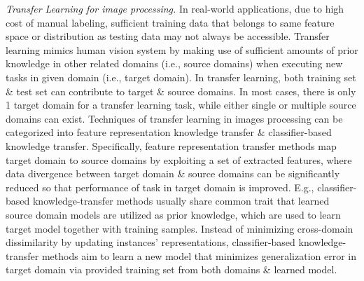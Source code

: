 \documentclass{article}
\begin{document}
\begin{itemize}
\begin{itemize}
\begin{itemize}
            {\it Transfer Learning for image processing.} In real-world applications, due to high cost of manual labeling, sufficient training data that belongs to same feature space or distribution as testing data may not always be accessible. Transfer learning mimics human vision system by making use of sufficient amounts of prior knowledge in other related domains (i.e., source domains) when executing new tasks in given domain (i.e., target domain). In transfer learning, both training set \& test set can contribute to target \& source domains. In most cases, there is only 1 target domain for a transfer learning task, while either single or multiple source domains can exist. Techniques of transfer learning in images processing can be categorized into feature representation knowledge transfer \& classifier-based knowledge transfer. Specifically, feature representation transfer methods map target domain to source domains by exploiting a set of extracted features, where data divergence between target domain \& source domains can be significantly reduced so that performance of task in target domain is improved. E.g., classifier-based knowledge-transfer methods usually share common trait that learned source domain models are utilized as prior knowledge, which are used to learn target model together with training samples. Instead of minimizing cross-domain dissimilarity by updating instances' representations, classifier-based knowledge-transfer methods aim to learn a new model that minimizes generalization error in target domain via provided training set from both domains \& learned model.


\end{itemize}
\end{itemize}
\end{itemize}
\end{document}
